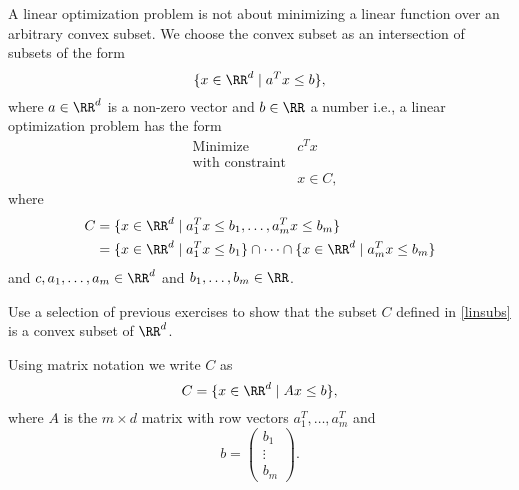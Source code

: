 \documentclass{article}
\begin{document}
  A linear optimization problem is not about minimizing a linear function over
  an arbitrary convex subset. We choose the convex subset as an intersection of
  subsets of the form
  $$
  \{x\in \RR^d\mid a^T x \leq b\},
  $$
  where $a\in \RR^d$ is a non-zero vector and $b\in \RR$ a number i.e.,
  a linear optimization problem has the form
  \begin{align*}
    &\text{Minimize} &c^T x\\
    &\text{with constraint}\\
      &&x\in C,
  \end{align*}
  where
  \begin{align}\label{linsubs}
    C &= \{x\in \RR^d \mid a_1^T x \leq b_1, \dots, a_m^T x\leq b_m\}\\
    &= \{x\in \RR^d \mid a_1^T x \leq b_1\} \cap \cdots \cap \{x\in \RR^d \mid a_m^T x \leq b_m\}
  \end{align}
  and $c, a_1, \dots, a_m\in \RR^d$ and $b_1, \dots, b_m\in \RR$.

  \beginshex
  Use a selection of previous exercises to show that
  the subset $C$ defined in \eqref{linsubs} is a convex subset of $\RR^d$.
  \endshex
  
  Using matrix notation we write $C$ as
  $$
  C = \{x\in \RR^d \mid A x \leq b\},
  $$
  where $A$ is the $m\times d$ matrix with row vectors $a_1^T, \dots, a_m^T$ and
  $$
  b =
  \begin{pmatrix}
    b_1 \\ \vdots \\ b_m
  \end{pmatrix}.
  $$
\end{document}
